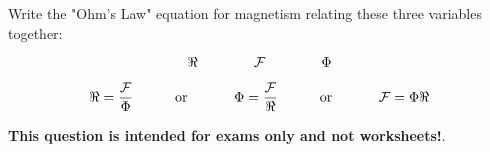

Write the "Ohm's Law" equation for magnetism relating these three variables together:

$$\Re \hbox{\hskip 40pt} {\cal F} \hbox{\hskip 40pt} \Phi$$







$$\Re = {{\cal F} \over \Phi} \hbox{\hskip 30pt or \hskip 30pt} \Phi = {{\cal F} \over \Re} \hbox{\hskip 30pt or \hskip 30pt} {\cal F} = \Phi  \Re$$







{\bf This question is intended for exams only and not worksheets!}.



